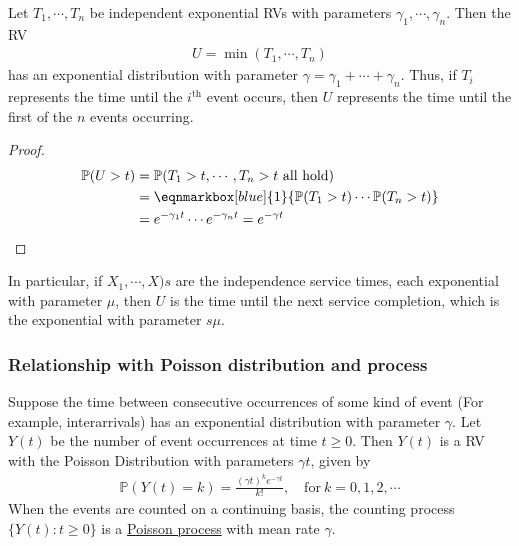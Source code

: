\begin{proposition}
    Let $T_1,\cdots,T_n$ be independent exponential RVs with parameters $\gamma_1,\cdots,\gamma_n$. Then the RV 
    \begin{align*}
        U = \min(T_1,\cdots, T_n)
    \end{align*}
    has an exponential distribution with parameter $\gamma = \gamma_1 + \cdots + \gamma_n$. Thus, if $T_i$ represents the time until the $i^{\text{th}}$ event occurs, then $U$ represents the time until the first of the $n$ events occurring. 
\end{proposition}
\begin{proof}
    \begin{align*}
        \mathbb{P}(U>t) &= \mathbb{P}(T_1>t,\cdots, T_n>t\ \text{all hold}) \\
        & = \eqnmarkbox[blue]{1}{\mathbb{P}(T_1>t) \cdots \mathbb{P}(T_n>t)} \\
        & = e^{-\gamma_1 t} \cdots e^{-\gamma_n t} = e^{-\gamma t}
    \end{align*}
    
\end{proof}

In particular, if $X_1,\cdots,X)s$ are the independence service times, each exponential with parameter $\mu$, then $U$ is the time until the next service completion, which is the exponential with parameter $s\mu$.

\subsubsection{Relationship with Poisson distribution and process}
Suppose the time between consecutive occurrences of some kind of event (For example, interarrivals) has an exponential distribution with parameter $\gamma$. Let $Y(t)$ be the number of event occurrences at time $t\geqslant 0$. Then $Y(t)$ is a RV with the Poisson Distribution with parameters $\gamma t$, given by
\begin{align*}
    \mathbb{P}(Y(t) = k) = \frac{(\gamma t)^k e^{-\gamma t}}{k!},\quad  \text{for}\ k=0,1,2,\cdots
\end{align*}
When the events are counted on a continuing basis, the counting process $\{Y(t):t\geqslant 0\}$ is a \uline{Poisson process} with mean rate $\gamma$.

